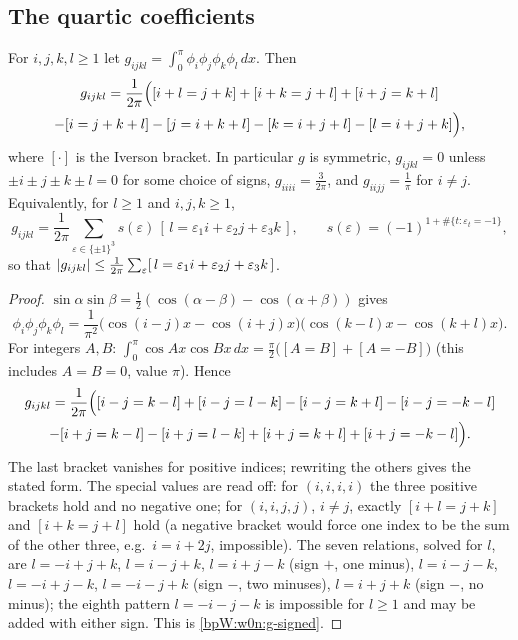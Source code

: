 \subsection{The quartic coefficients}\label{bpW:w0n:coeff}

\begin{lemma}\label{bpW:w0n:quartic-coeff}
For $i,j,k,l\ge1$ let $g_{ijkl}=\int_0^\pi\phi_i\phi_j\phi_k\phi_l\,dx$. Then
\begin{multline*}g_{ijkl}=\frac{1}{2\pi}\Bigl([i+l=j+k]+[i+k=j+l]+[i+j=k+l]\\-[i=j+k+l]-[j=i+k+l]-[k=i+j+l]-[l=i+j+k]\Bigr),\end{multline*}
where $[\cdot]$ is the Iverson bracket. In particular $g$ is symmetric, $g_{ijkl}=0$ unless
$\pm i\pm j\pm k\pm l=0$ for some choice of signs, $g_{iiii}=\frac{3}{2\pi}$, and $g_{iijj}=\frac1\pi$ for $i\ne j$.
Equivalently, for $l\ge1$ and $i,j,k\ge1$,
\begin{equation}\label{bpW:w0n:g-signed}
g_{ijkl}=\frac1{2\pi}\sum_{\varepsilon\in\{\pm1\}^3}s(\varepsilon)\,[\,l=\varepsilon_1i+\varepsilon_2j+\varepsilon_3k\,],
\qquad s(\varepsilon)=(-1)^{1+\#\{t:\varepsilon_t=-1\}},
\end{equation}
so that $\lvert g_{ijkl}\rvert\le\frac1{2\pi}\sum_\varepsilon[\,l=\varepsilon_1i+\varepsilon_2j+\varepsilon_3k\,]$.
\end{lemma}

\begin{proof}
\label{stepW:w0n:prod}
$\sin\alpha\sin\beta=\frac12(\cos(\alpha-\beta)-\cos(\alpha+\beta))$ gives
\[\phi_i\phi_j\phi_k\phi_l=\frac{1}{\pi^2}\bigl(\cos(i-j)x-\cos(i+j)x\bigr)\bigl(\cos(k-l)x-\cos(k+l)x\bigr).\]
\label{stepW:w0n:cos}
For integers $A,B$: $\int_0^\pi\cos Ax\cos Bx\,dx=\frac\pi2\bigl([A=B]+[A=-B]\bigr)$ (this includes $A=B=0$, value
$\pi$). Hence
\begin{multline*}g_{ijkl}=\frac1{2\pi}\Bigl([i-j=k-l]+[i-j=l-k]-[i-j=k+l]-[i-j=-k-l]\\-[i+j=k-l]-[i+j=l-k]+[i+j=k+l]+[i+j=-k-l]\Bigr).\end{multline*}
The last bracket vanishes for positive indices; rewriting the others gives the stated form. The special values are
read off: for $(i,i,i,i)$ the three positive brackets hold and no negative one; for $(i,i,j,j)$, $i\neq j$, exactly
$[i+l=j+k]$ and $[i+k=j+l]$ hold (a negative bracket would force one index to be the sum of the other three, e.g.\
$i=i+2j$, impossible).
\label{stepW:w0n:signed}
The seven relations, solved for $l$, are $l=-i+j+k$, $l=i-j+k$, $l=i+j-k$ (sign $+$, one minus),
$l=i-j-k$, $l=-i+j-k$, $l=-i-j+k$ (sign $-$, two minuses), $l=i+j+k$ (sign $-$, no minus); the eighth pattern
$l=-i-j-k$ is impossible for $l\ge1$ and may be added with either sign. This is \eqref{bpW:w0n:g-signed}.
\end{proof}

